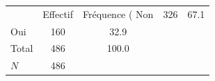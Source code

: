 {
\def\sym#1{\ifmmode^{#1}\else\(^{#1}\)\fi}
\begin{tabular}{l*{1}{cc}}
\toprule
            &    Effectif&Fréquence (%
\midrule
Non         &         326&        67.1\\
Oui         &         160&        32.9\\
Total       &         486&       100.0\\
\midrule
\(N\)       &         486&            \\
\bottomrule
\end{tabular}
}
